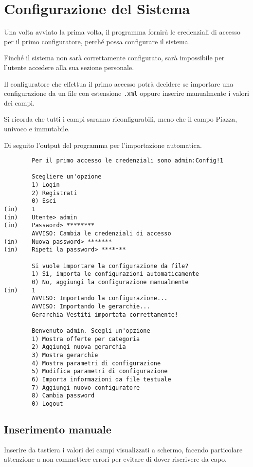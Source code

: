 \section{Configurazione del Sistema}
Una volta avviato la prima volta, il programma fornirà le credenziali di accesso per il primo configuratore, perché possa configurare il sistema.

Finché il sistema non sarà correttamente configurato, sarà impossibile per l'utente accedere alla sua sezione personale.

Il configuratore che effettua il primo accesso potrà decidere se importare una configurazione da un file con estensione \verb|.xml| oppure inserire manualmente i valori dei campi.

Si ricorda che tutti i campi saranno riconfigurabili, meno che il campo Piazza, univoco e immutabile.

Di seguito l'output del programma per l'importazione automatica.
\begin{lstlisting}
        Per il primo accesso le credenziali sono admin:Config!1

        Scegliere un'opzione
        1) Login
        2) Registrati
        0) Esci
(in)    1
(in)    Utente> admin
(in)    Password> ********
        AVVISO: Cambia le credenziali di accesso
(in)    Nuova password> *******
(in)    Ripeti la password> *******
        
        Si vuole importare la configurazione da file?
        1) Sì, importa le configurazioni automaticamente
        0) No, aggiungi la configurazione manualmente
(in)    1
        AVVISO: Importando la configurazione...
        AVVISO: Importando le gerarchie...
        Gerarchia Vestiti importata correttamente!
        
        Benvenuto admin. Scegli un'opzione
        1) Mostra offerte per categoria
        2) Aggiungi nuova gerarchia
        3) Mostra gerarchie
        4) Mostra parametri di configurazione
        5) Modifica parametri di configurazione
        6) Importa informazioni da file testuale
        7) Aggiungi nuovo configuratore
        8) Cambia password
        0) Logout
\end{lstlisting}

\subsection{Inserimento manuale}

Inserire da tastiera i valori dei campi visualizzati a schermo, facendo particolare attenzione a non commettere errori per evitare di dover riscrivere da capo.

